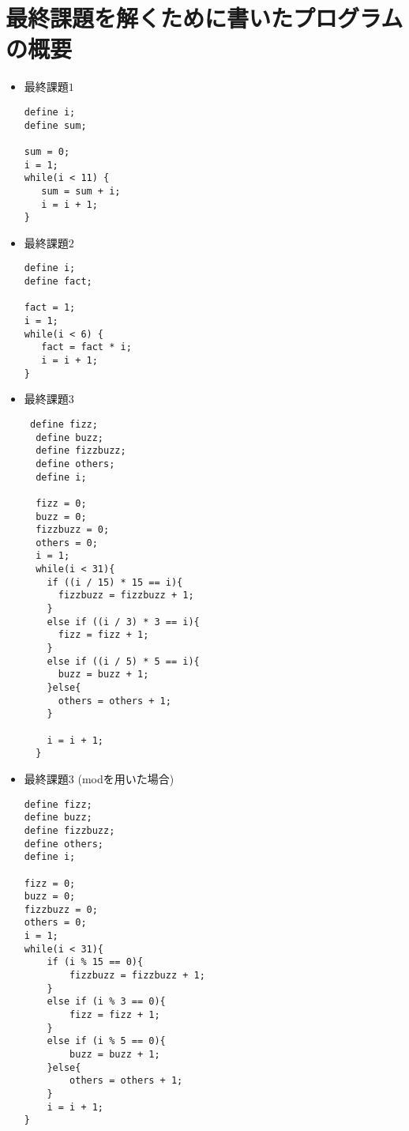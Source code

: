 \documentclass{jarticle}[11pt]
\begin{document}
\section{最終課題を解くために書いたプログラムの概要}
\begin{itemize}
\item 最終課題$1$
\begin{verbatim}
define i;
define sum;

sum = 0;
i = 1;
while(i < 11) {
   sum = sum + i;
   i = i + 1;
}
\end{verbatim}

\item 最終課題$2$
\begin{verbatim}
define i;
define fact;

fact = 1;
i = 1;
while(i < 6) {
   fact = fact * i;
   i = i + 1;
}
\end{verbatim}

\item 最終課題$3$
\begin{verbatim}
 define fizz;
  define buzz;
  define fizzbuzz;
  define others;
  define i;

  fizz = 0; 
  buzz = 0;
  fizzbuzz = 0; 
  others = 0;
  i = 1;
  while(i < 31){
    if ((i / 15) * 15 == i){
      fizzbuzz = fizzbuzz + 1;
    }
    else if ((i / 3) * 3 == i){
      fizz = fizz + 1;
    }
    else if ((i / 5) * 5 == i){
      buzz = buzz + 1;
    }else{
      others = others + 1;
    }

    i = i + 1;
  }
\end{verbatim}


\item 最終課題$3$ (modを用いた場合)
\begin{verbatim}
define fizz;
define buzz;
define fizzbuzz;
define others;
define i;

fizz = 0; 
buzz = 0;
fizzbuzz = 0; 
others = 0;
i = 1;
while(i < 31){
    if (i % 15 == 0){
        fizzbuzz = fizzbuzz + 1;
    }
    else if (i % 3 == 0){
        fizz = fizz + 1;
    }
    else if (i % 5 == 0){
        buzz = buzz + 1;
    }else{
        others = others + 1;
    }    
    i = i + 1;
}
\end{verbatim}
\end{itemize}

\end{document}
